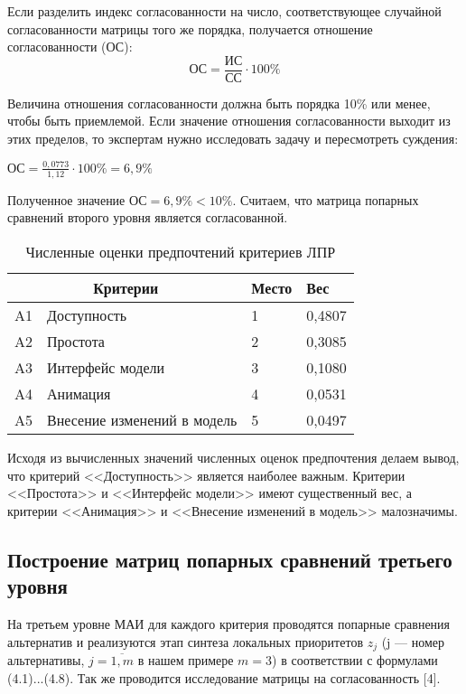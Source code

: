 Если разделить индекс согласованности на число, соответствующее случайной согласованности матрицы того же порядка, получается отношение согласованности (ОС):
\begin{equation}
\text{ОС} = \frac{\text{ИС}}{\text{СС}} \cdot 100\%
\end{equation}

Величина отношения согласованности должна быть порядка 10\% или менее, чтобы быть приемлемой.
Если значение отношения согласованности выходит из этих пределов, то экспертам нужно исследовать задачу и пересмотреть суждения:

$\text{ОС} = \frac{0,0773}{1,12} \cdot 100\% = 6,9\%$

Полученное значение $\text{ОС} = 6,9\% < 10\%$.
Считаем, что матрица попарных сравнений второго уровня является согласованной.
\begin{table}[H]
  \caption{Численные оценки предпочтений критериев ЛПР}\label{marks}
  \begin{tabular}{|l|l|l|l|}
  \hline \multicolumn{2}{|c|}{Критерии} & Место & Вес \\
  \hline A1 & Доступность & 1 & 0,4807 \\
  \hline A2 & Простота & 2 & 0,3085 \\
  \hline A3 & Интерфейс модели & 3 & 0,1080 \\
  \hline A4 & Анимация & 4 & 0,0531 \\
  \hline A5 & Внесение изменений в модель & 5 & 0,0497 \\
  \hline
  \end{tabular}
\end{table}

Исходя из вычисленных значений численных оценок предпочтения делаем вывод, что критерий <<Доступность>> является наиболее важным.
Критерии <<Простота>> и <<Интерфейс модели>> имеют существенный вес, а критерии <<Анимация>> и <<Внесение изменений в модель>> малозначимы.

\subsection{Построение матриц попарных сравнений третьего уровня}

На третьем уровне МАИ для каждого критерия проводятся попарные сравнения альтернатив и реализуются этап синтеза локальных приоритетов $z_j$ (j --- номер альтернативы, $j = \overline{1,m}$ в нашем примере $m = 3$) в соответствии с
формулами (4.1)...(4.8).
Так же проводится исследование матрицы на согласованность [4].

